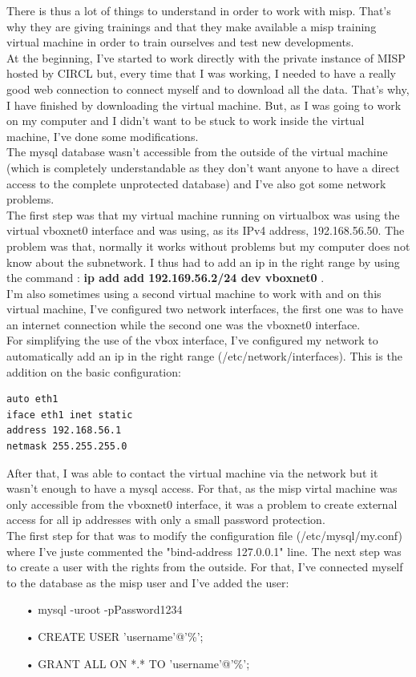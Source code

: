 \documentclass{eplmastersthesis}
\begin{document}
There is thus a lot of things to understand in order to work with misp. That's why they are giving trainings and that they make available a misp training virtual machine in order to train ourselves and test new developments.\\
At the beginning, I've started to work directly with the private instance of MISP hosted by CIRCL but, every time that I was working, I needed to have a really good web connection to connect myself and to download all the data. That's why, I have finished by downloading the virtual machine. But, as I was going to work on my computer and I didn't want to be stuck to work inside the virtual machine, I've done some modifications.\\
The mysql database wasn't accessible from the outside of the virtual machine (which is completely understandable as they don't want anyone to have a direct access to the complete unprotected database) and I've also got some network problems.\\
The first step was that my virtual machine running on virtualbox was using the virtual vboxnet0 interface and was using, as its IPv4 address, 192.168.56.50. The problem was that, normally it works without problems but my computer does not know about the subnetwork. I thus had to add an ip in the right range by using the command :
\textbf{ip add add 192.169.56.2/24 dev vboxnet0} .\\
I'm also sometimes using a second virtual machine to work with and on this virtual machine, I've configured two network interfaces, the first one was to have an internet connection while the second one was the vboxnet0 interface.\\
For simplifying the use of the vbox interface, I've configured my network to automatically add an ip in the right range (/etc/network/interfaces). This is the addition on the basic configuration:
\begin{verbatim}
auto eth1
iface eth1 inet static
address 192.168.56.1
netmask 255.255.255.0
\end{verbatim}
 
After that, I was able to contact the virtual machine via the network but it wasn't enough to have a mysql access. For that, as the misp virtal machine was only accessible from the vboxnet0 interface, it was a problem to create external access for all ip addresses with only a small password protection.\\
The first step for that was to modify the configuration file (/etc/mysql/my.conf) where I've juste commented the "bind-address 127.0.0.1" line.
The next step was to create a user with the rights from the outside. For that, I've connected myself to the database as the misp user and I've added the user:
\begin{itemize}
\item[•] mysql -uroot -pPassword1234 
\item[•] CREATE USER 'username'@'\%';
\item[•] GRANT ALL ON *.* TO 'username'@'\%';
\end{itemize}
\end{document}
